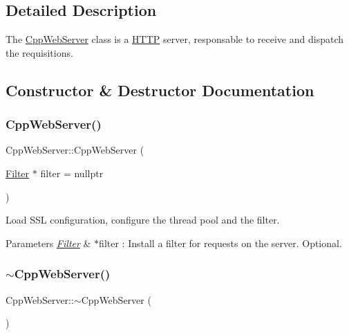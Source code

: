 \subsection{Detailed Description}
The \hyperlink{class_cpp_web_server}{Cpp\+Web\+Server} class is a \hyperlink{namespace_h_t_t_p}{H\+T\+TP} server, responsable to receive and dispatch the requisitions. 

\subsection{Constructor \& Destructor Documentation}
\mbox{\label{class_cpp_web_server_a7cfe4db08561ebe79168d8b638a6cd7f}} 
\subsubsection{\texorpdfstring{Cpp\+Web\+Server()}{CppWebServer()}}
{\footnotesize\ttfamily Cpp\+Web\+Server\+::\+Cpp\+Web\+Server (\begin{DoxyParamCaption}\item[{\hyperlink{class_filter}{Filter} $\ast$}]{filter = {\ttfamily nullptr} }\end{DoxyParamCaption})\hspace{0.3cm}{\ttfamily [explicit]}}



Load S\+SL configuration, configure the thread pool and the filter. 


\begin{DoxyParams}{Parameters}
{\em \hyperlink{class_filter}{Filter}} & $\ast$filter \+: Install a filter for requests on the server. Optional. \\
\hline
\end{DoxyParams}
\mbox{\label{class_cpp_web_server_a6b9d6874d16f6491c511fb4b8793a5f8}} 
\subsubsection{\texorpdfstring{$\sim$\+Cpp\+Web\+Server()}{~CppWebServer()}}
{\footnotesize\ttfamily Cpp\+Web\+Server\+::$\sim$\+Cpp\+Web\+Server (\begin{DoxyParamCaption}{ }\end{DoxyParamCaption})}



